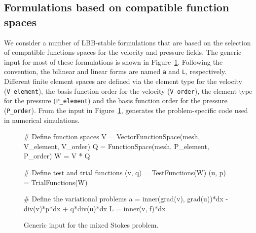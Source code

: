 \subsection{Formulations based on compatible function spaces}

We consider a number of LBB-stable formulations that are based on the
selection of compatible functions spaces for the velocity and pressure
fields.  The generic \ufl{} input for most of these formulations is shown in
Figure~\ref{code:terrel:var:mixed}.  Following the \ufl{} convention, the
bilinear and linear forms are named {\tt a} and {\tt L}, respectively.
Different finite element spaces are defined via the element type for
the velocity ({\tt V\_element}), the basis function order for the velocity
({\tt V\_order}), the element type for the pressure ({\tt P\_element}) and
the basis function order for the pressure ({\tt P\_order}). From the input
in Figure~\ref{code:terrel:var:mixed}, \ffc{} generates the problem-specific
code used in numerical simulations.
%
\begin{figure}
\begin{python}
# Define function spaces
V = VectorFunctionSpace(mesh, V_element, V_order)
Q = FunctionSpace(mesh, P_element, P_order)
W = V * Q

# Define test and trial functions
(v, q) = TestFunctions(W)
(u, p) = TrialFunctions(W)

# Define the variational problems
a = inner(grad(v), grad(u))*dx - div(v)*p*dx + q*div(u)*dx
L = inner(v, f)*dx
\end{python}
\caption{Generic \ufl{} input for the mixed Stokes problem.}
\label{code:terrel:var:mixed}
\end{figure}

